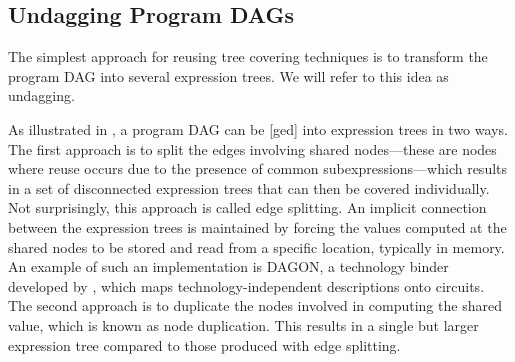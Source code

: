 \subsection{Undagging Program DAGs}

The simplest approach for reusing \gls{tree covering} techniques is to transform
the \gls{program DAG} into several \glspl{expression tree}.
%
We will refer to this
idea as \gls{undagging}.

As illustrated in , a \gls{program DAG} can be
[ged] into \glspl{expression tree} in two ways.
%
The first
approach is to split the edges involving \glspl{shared node}---these are
\glspl{node} where reuse occurs due to the presence of common
subexpressions---which results in a set of disconnected \glspl{expression tree}
that can then be covered individually.
%
Not surprisingly, this approach is called
\gls{edge splitting}.
%
An implicit connection between the \glspl{expression tree} is
maintained by forcing the values computed at the \glspl{shared node} to be
stored and read from a specific location, typically in memory.
%
An example of
such an implementation is \gls{DAGON}, a technology binder developed by
\textcite{Keutzer1987}, which maps technology-independent descriptions onto
circuits.
%
The second approach is to duplicate the \glspl{node} involved in
computing the shared value, which is known as \gls{node duplication}.
%
This
results in a single but larger \gls{expression tree} compared to those produced
with \gls{edge splitting}.

%      
%
%      
%
%      
%

